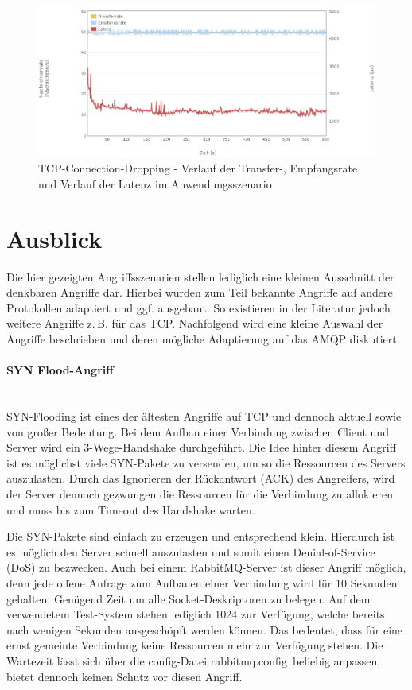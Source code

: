 \documentclass[	a4paper,
			11pt,
			oneside,
			parskip]{scrartcl}
\begin{document}
		\begin{figure}[!htb]
			\centering
			\includegraphics[width=\textwidth]{img/tcpdrop/tcpdrop_scenario.png}
			\caption{TCP-Connection-Dropping - Verlauf der Transfer-, Empfangsrate und Verlauf der Latenz im Anwendungsszenario}
			\label{fig:tcpdrop-scenario}
		\end{figure}
		
		
\clearpage
\section*{Ausblick}
	Die hier gezeigten Angriffsszenarien stellen lediglich eine kleinen Ausschnitt der denkbaren Angriffe dar. Hierbei wurden zum Teil bekannte Angriffe auf andere Protokollen adaptiert und ggf. ausgebaut.
	So existieren in der Literatur jedoch weitere Angriffe z.\,B. für das TCP. Nachfolgend wird eine kleine Auswahl der Angriffe beschrieben und deren mögliche Adaptierung auf das AMQP diskutiert. 

	\paragraph{SYN Flood-Angriff} \ \\
		SYN-Flooding ist eines der ältesten Angriffe auf TCP und dennoch aktuell sowie von großer Bedeutung. Bei dem Aufbau einer Verbindung zwischen Client und Server wird ein 3-Wege-Handshake durchgeführt. Die Idee hinter diesem Angriff ist es möglichst viele SYN-Pakete zu versenden, um so die Ressourcen des Servers auszulasten. Durch das Ignorieren der Rückantwort (ACK) des Angreifers, wird der Server dennoch gezwungen die Ressourcen für die Verbindung zu allokieren und muss bis zum Timeout des Handshake warten.

		Die SYN-Pakete sind einfach zu erzeugen und entsprechend klein. Hierdurch ist es möglich den Server schnell auszulasten und somit einen Denial-of-Service (DoS) zu bezwecken. Auch bei einem RabbitMQ-Server ist dieser Angriff möglich, denn jede offene Anfrage zum Aufbauen einer Verbindung wird für 10 Sekunden gehalten. Genügend Zeit um alle Socket-Deskriptoren zu belegen. Auf dem verwendetem
		Test-System stehen lediglich 1024 zur Verfügung, welche bereits nach wenigen Sekunden ausgeschöpft werden können. Das bedeutet, dass für eine ernst gemeinte Verbindung keine Ressourcen mehr zur Verfügung stehen. Die Wartezeit lässt sich über die config-Datei \glqq rabbitmq.config\grqq\ beliebig anpassen, bietet dennoch keinen Schutz vor diesen Angriff.
\end{document}

